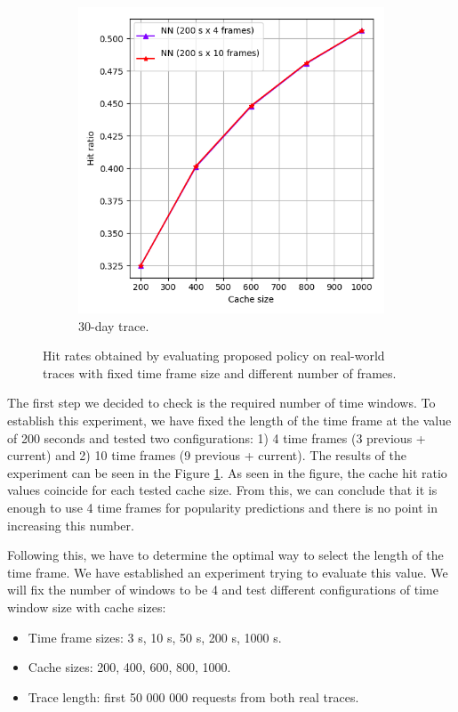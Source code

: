 \begin{figure}[t!]
\begin{subfigure}[b]{0.49\linewidth}
		\includegraphics[width=\linewidth]{pics/cache5_2.png}
		\caption{30-day trace.}
	\end{subfigure}
	\caption{Hit rates obtained by evaluating proposed policy on real-world traces with fixed time frame size and different number of frames.}
	\label{fig:cache5}
\end{figure}

The first step we decided to check is the required number of time windows. To establish this experiment, we have fixed the length of the time frame at the value of 200 seconds and tested two configurations: 1) 4 time frames (3 previous + current) and 2) 10 time frames (9 previous + current). The results of the experiment can be seen in the Figure \ref{fig:cache5}. As seen in the figure, the cache hit ratio values coincide for each tested cache size. From this, we can conclude that it is enough to use 4 time frames for popularity predictions and there is no point in increasing this number.


Following this, we have to determine the optimal way to select the length of the time frame. We have established an experiment trying to evaluate this value. We will fix the number of windows to be 4 and test different configurations of time window size with cache sizes:

\begin{itemize}
	\item Time frame sizes: 3 s, 10 s, 50 s, 200 s, 1000 s.
	\item Cache sizes: 200, 400, 600, 800, 1000.
	\item Trace length: first 50 000 000 requests from both real traces.
\end{itemize}

